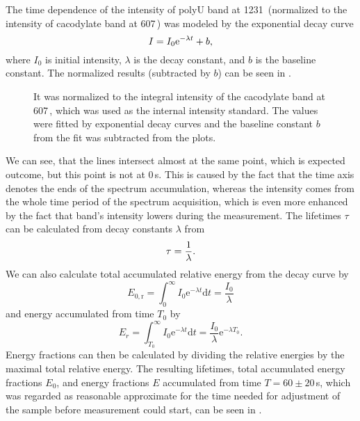 The time dependence of the intensity of polyU band at 1231\,\icm{} (normalized
to the intensity of cacodylate band at 607\,\icm) was modeled by the
exponential decay curve
\begin{equation}
	I = I_0 \text{e}^{-\lambda t} + b,
	\label{\eqnlabel{power_optim:decay}}
\end{equation}
where $I_0$ is initial intensity, $\lambda$ is the decay constant, and $b$ is
the baseline constant.
The normalized results (subtracted by $b$) can be seen in
.

\begin{figure}
	\centering
	
	\caption[%
		Decrease of the integral intensity of polyU band at 1231\,\icm{} for
		different excitation laser powers in raw spectra.%
	]{%
		It was normalized to the integral intensity of the cacodylate band at
		607\,\icm{}, which was used as the internal intensity standard.
		The values were fitted by exponential decay curves
		and the baseline constant $b$ from the fit was subtracted from the plots.
	}
	\label{\figlabel{power_optim:triplexes}}
\end{figure}

We can see, that the lines intersect almost at the same point, which is
expected outcome, but this point is not at 0\,s.
This is caused by the fact that the time axis denotes the ends of the spectrum
accumulation, whereas the intensity comes from the whole time period of the
spectrum acquisition, which is even more enhanced by the fact that band's
intensity lowers during the measurement.
The lifetimes $\tau$ can be calculated from decay constants $\lambda$ from
\begin{equation}
	\tau = \frac{1}{\lambda}.
	\label{\eqnlabel{power_optim:lifetime}}
\end{equation}
We can also calculate total accumulated relative energy from the decay curve
by
\begin{equation*}
	E_{0,\text{r}}
		= \int_0^{\infty}{I_0 \text{e}^{-\lambda t}\text{d}t}
		= \frac{I_0}{\lambda}
\end{equation*}
and energy accumulated from time $T_0$ by
\begin{equation*}
	E_r	= \int_{T_0}^{\infty}{I_0 \text{e}^{-\lambda t}\text{d}t}
		= \frac{I_0}{\lambda} \text{e}^{-\lambda T_0}.
\end{equation*}
Energy fractions can then be calculated by dividing the relative energies by
the maximal total relative energy. The resulting lifetimes, total accumulated
energy fractions $E_0$, and energy fractions $E$ accumulated from time
$T = 60\pm20$\,s, which was regarded as reasonable approximate for the time
needed for adjustment of the sample before measurement could start, can be
seen in
.

